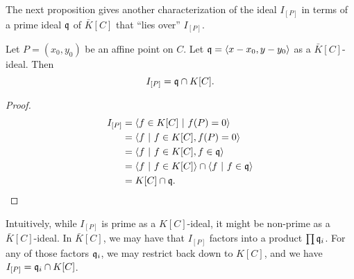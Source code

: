 The next proposition gives another characterization of the ideal $I_{[P]}$
in terms of a prime ideal $\frak q$ of $\bar K[C]$ that ``lies over'' $I_{[P]}$.
\begin{proposition}
  Let $P = (x_0, y_0)$ be an affine point on $C$.
  Let $\frak q = \left\langle x - x_0, y - y_0 \right\rangle$ as a $\bar K[C]$-ideal. Then
  \[ I_{[P]} = \frak q \cap K[C]. \]
\end{proposition}
\begin{proof}
  \begin{align*}
    I_{[P]}
      &= \left\langle  f \in K[C] ~|~ f(P) = 0  \right\rangle \\
      &= \left\langle  f ~|~ f \in K[C], f(P) = 0  \right\rangle \\
      &= \left\langle  f ~|~ f \in K[C], f \in \frak q  \right\rangle \\
      &= \left\langle  f ~|~ f \in K[C] \right\rangle \cap \left\langle  f ~|~ f \in \frak q  \right\rangle \\
      &= K[C] \cap \frak q.
  \end{align*}
\end{proof}
Intuitively, while $I_{[P]}$ is prime as a $K[C]$-ideal, it might be non-prime as a $\bar K[C]$-ideal.
In $\bar K[C]$, we may have that $I_{[P]}$ factors into a product $\prod \frak q_i$.
For any of those factors $\frak q_i$, we may restrict back down to $K[C]$, and we have $I_{[P]} = \frak q_i \cap K[C]$. 

